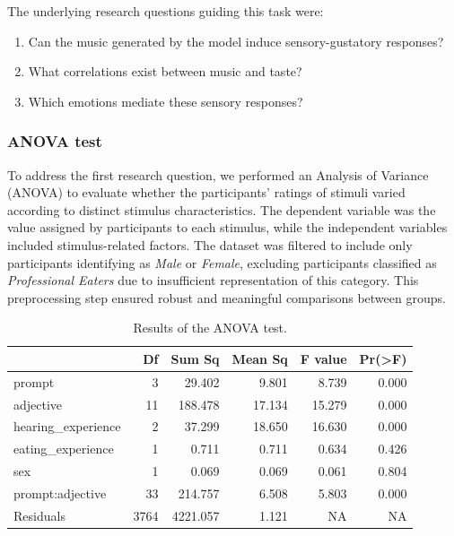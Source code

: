 \documentclass[
  letterpaper,
  DIV=11,
  numbers=noendperiod]{scrartcl}
\providecommand{\tightlist}{%
  \setlength{\itemsep}{0pt}\setlength{\parskip}{0pt}}\usepackage{longtable,booktabs,array}
\begin{document}
The underlying research questions guiding this task were:

\begin{enumerate}
\def\labelenumi{\arabic{enumi}.}
\tightlist
\item
  Can the music generated by the model induce sensory-gustatory
  responses?
\item
  What correlations exist between music and taste?
\item
  Which emotions mediate these sensory responses?
\end{enumerate}

\subsubsection{ANOVA test}\label{anova-test}

To address the first research question, we performed an Analysis of
Variance (ANOVA) to evaluate whether the participants' ratings of
stimuli varied according to distinct stimulus characteristics. The
dependent variable was the value assigned by participants to each
stimulus, while the independent variables included stimulus-related
factors. The dataset was filtered to include only participants
identifying as \emph{Male} or \emph{Female}, excluding participants
classified as \emph{Professional Eaters} due to insufficient
representation of this category. This preprocessing step ensured robust
and meaningful comparisons between groups.

\begin{longtable}[]{@{}lrrrrr@{}}

\caption{\label{tbl-anova-value}Results of the ANOVA test.}

\tabularnewline

\toprule\noalign{}
& Df & Sum Sq & Mean Sq & F value & Pr(\textgreater F) \\
\midrule\noalign{}
\endhead
\bottomrule\noalign{}
\endlastfoot
prompt & 3 & 29.402 & 9.801 & 8.739 & 0.000 \\
adjective & 11 & 188.478 & 17.134 & 15.279 & 0.000 \\
hearing\_experience & 2 & 37.299 & 18.650 & 16.630 & 0.000 \\
eating\_experience & 1 & 0.711 & 0.711 & 0.634 & 0.426 \\
sex & 1 & 0.069 & 0.069 & 0.061 & 0.804 \\
prompt:adjective & 33 & 214.757 & 6.508 & 5.803 & 0.000 \\
Residuals & 3764 & 4221.057 & 1.121 & NA & NA \\

\end{longtable}
\end{document}
